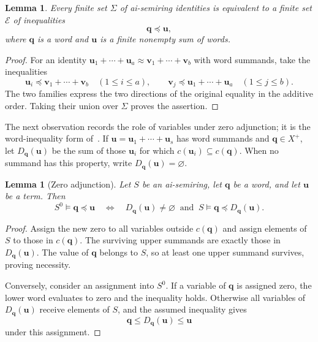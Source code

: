 \documentclass[11pt,reqno]{amsart}
\newtheorem{lemma}[theorem]{Lemma}
\theoremstyle{definition}
\numberwithin{equation}{section}
\newcommand{\bu}{\mathbf{u}}
\newcommand{\bv}{\mathbf{v}}
\newcommand{\bq}{\mathbf{q}}
\newcommand{\calE}{\mathcal{E}}
\renewcommand{\leq}{\leqslant}
\begin{document}
\begin{lemma}\label{lem:reduction}
Every finite set $\Sigma$ of ai-semiring identities is equivalent to a finite set $\calE$ of inequalities
\[
 \bq\preceq\bu,
\]
where $\bq$ is a word and $\bu$ is a finite nonempty sum of words.
\end{lemma}
\begin{proof}
For an identity $\bu_1+\cdots+\bu_a\approx\bv_1+\cdots+\bv_b$ with word summands, take the inequalities
\[
 \bu_i\preceq\bv_1+\cdots+\bv_b\quad(1\leq i\leq a),
 \qquad
 \bv_j\preceq\bu_1+\cdots+\bu_a\quad(1\leq j\leq b).
\]
The two families express the two directions of the original equality in the additive order. Taking their union over $\Sigma$ proves the assertion.
\end{proof}

The next observation records the role of variables under zero adjunction; it is the word-inequality form of~\cite[Proposition~1.5]{wrz}. If $\bu=\bu_1+\cdots+\bu_s$ has word summands and $\bq\in X^+$, let $D_{\bq}(\bu)$ be the sum of those $\bu_i$ for which $c(\bu_i)\subseteq c(\bq)$. When no summand has this property, write $D_{\bq}(\bu)=\varnothing$.

\begin{lemma}[Zero adjunction]\label{lem:zeroidentity}
Let $S$ be an ai-semiring, let $\bq$ be a word, and let $\bu$ be a term. Then
\[
 S^0\models\bq\preceq\bu
 \quad\Longleftrightarrow\quad
 D_{\bq}(\bu)\ne\varnothing
 \ \text{ and }\ S\models\bq\preceq D_{\bq}(\bu).
\]
\end{lemma}
\begin{proof}
Assign the new zero to all variables outside $c(\bq)$ and assign elements of $S$ to those in $c(\bq)$. The surviving upper summands are exactly those in $D_{\bq}(\bu)$. The value of $\bq$ belongs to $S$, so at least one upper summand survives, proving necessity.

Conversely, consider an assignment into $S^0$. If a variable of $\bq$ is assigned zero, the lower word evaluates to zero and the inequality holds. Otherwise all variables of $D_{\bq}(\bu)$ receive elements of $S$, and the assumed inequality gives
\[
 \bq\leq D_{\bq}(\bu)\leq\bu
\]
under this assignment.
\end{proof}
\end{document}
